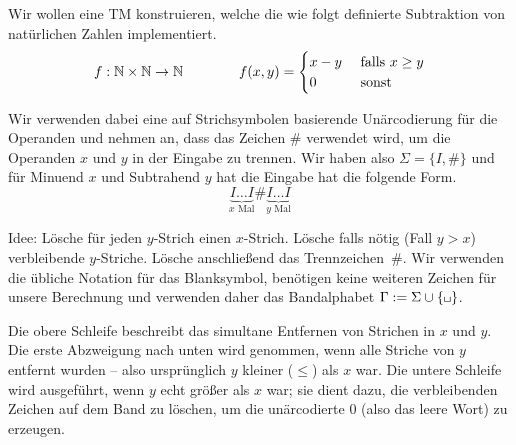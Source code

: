 \begin{Bsp}
Wir wollen eine \ac{TM} konstruieren, welche die wie folgt definierte Subtraktion von natürlichen Zahlen implementiert.
% 
% 
$$
f: \mathbb{N}\times\mathbb{N}\rightarrow \mathbb{N}
\qquad \qquad
f(x,y)=
\begin{cases}
 x - y & \text{ falls } x\geq y\\
 0  & \text{ sonst}
\end{cases}
$$

Wir verwenden dabei eine auf Strichsymbolen basierende Unärcodierung für die Operanden
und nehmen an, dass das Zeichen $\#$ verwendet wird, um die Operanden $x$ und $y$ in der Eingabe zu trennen.
Wir haben also $\Sigma=\{I,\#\}$ und für Minuend $x$ und Subtrahend $y$ hat die Eingabe hat die folgende Form. 
$$\underbrace{I\ldots I}_{x\text{ Mal}}\#\underbrace{I\ldots I}_{y\text{ Mal}}$$


Idee: Lösche für jeden $y$-Strich einen $x$-Strich.
Lösche falls nötig (Fall $y>x$) verbleibende $y$-Striche. Lösche anschließend das Trennzeichen~$\#$.
Wir verwenden die übliche Notation für das Blanksymbol, 
benötigen keine weiteren Zeichen für unsere Berechnung und verwenden daher das Bandalphabet $\Gamma:=\Sigma\cup\{\mblank\}$.

  \begin{center}
  \end{center}
  
  Die obere Schleife beschreibt das simultane Entfernen von Strichen in $x$ und $y$.
  Die erste Abzweigung nach unten wird genommen, wenn alle Striche von $y$ entfernt wurden -- also ursprünglich $y$ kleiner ($\leq$) als $x$ war.
  Die untere Schleife wird ausgeführt, wenn $y$ echt größer als $x$ war; sie dient dazu, die verbleibenden Zeichen auf dem Band zu löschen,
  um die unärcodierte $0$ (also das leere Wort) zu erzeugen.
\end{Bsp}
  
